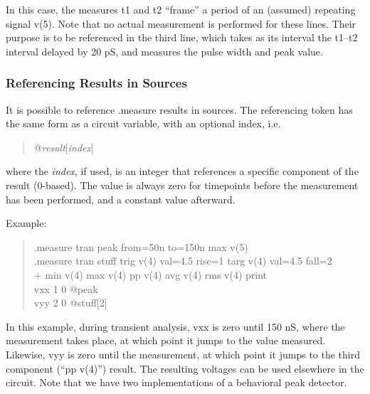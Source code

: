 In this case, the measures {\vt t1} and {\vt t2} ``frame'' a period
of an (assumed) repeating signal v(5).  Note that no actual
measurement is performed for these lines.  Their purpose is to be
referenced in the third line, which takes as its interval the {\vt
t1}--{\vt t2} interval delayed by 20 pS, and measures the pulse
width and peak value.

\subsubsection{Referencing Results in Sources}

It is possible to reference {\vt .measure} results in sources.  The
referencing token has the same form as a circuit variable, with an
optional index, i.e.
\begin{quote}\vt
    @{\it result\/}[{\it index\/}]
\end{quote}
where the {\it index\/}, if used, is an integer that references a
specific component of the result (0-based).  The value is always zero
for timepoints before the measurement has been performed, and a
constant value afterward.

Example:
\begin{quote}\vt
    .measure tran peak from=50n to=150n max v(5)\\
    .measure tran stuff trig v(4) val=4.5 rise=1 targ v(4) val=4.5 fall=2\\
    + min v(4) max v(4) pp v(4) avg v(4) rms v(4) print\\
    vxx 1 0 @peak\\
    vyy 2 0 @stuff[2]\\
\end{quote}

In this example, during transient analysis, {\vt vxx} is zero until
150 nS, where the measurement takes place, at which point it jumps to
the value measured.  Likewise, {\vt vyy} is zero until the
measurement, at which point it jumps to the third component (``{\vt pp
v(4)}'') result.  The resulting voltages can be used elsewhere in the
circuit.  Note that we have two implementations of a behavioral peak
detector.


\subsection{}


